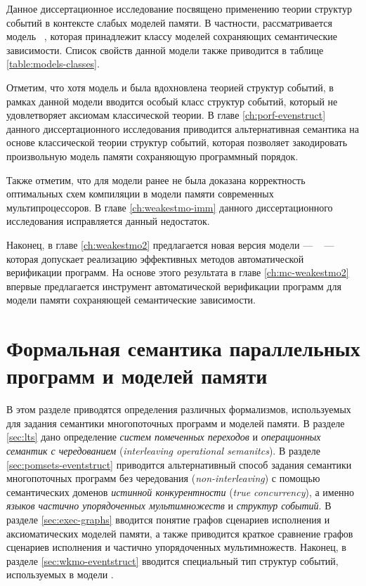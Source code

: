 Данное диссертационное исследование посвящено 
применению теории структур событий в контексте слабых моделей памяти. 
В частности, рассматривается модель \Wkm~\cite{Chakraborty-Vafeiadis:POPL19}, 
которая принадлежит классу моделей сохраняющих семантические зависимости. 
Список свойств данной модели также приводится в таблице \ref{table:models-classes}.

Отметим, что хотя модель \Wkm и была вдохновлена 
теорией структур событий, в рамках данной модели 
вводится особый класс структур событий, 
который не удовлетворяет аксиомам классической теории.
В главе \ref{ch:porf-evenstruct} данного диссертационного исследования 
приводится альтернативная семантика на основе 
классической теории структур событий,  
которая позволяет закодировать произвольную 
модель памяти сохраняющую программный порядок.

Также отметим, что для модели \Wkm ранее не была 
доказана корректность оптимальных схем компиляции 
в модели памяти современных мультипроцессоров. 
В главе \ref{ch:weakestmo-imm} данного диссертационного исследования 
исправляется данный недостаток. 

Наконец, в главе \ref{ch:weakestmo2} предлагается новая версия модели \Wkm --- 
\WkmS~ --- которая допускает реализацию эффективных методов 
автоматической верификации программ.
На основе этого результата в главе \ref{ch:mc-weakestmo2} 
впервые предлагается инструмент 
автоматической верификации программ для модели памяти 
сохраняющей семантические зависимости.  

\section{Формальная семантика параллельных программ и моделей памяти}

В этом разделе приводятся определения различных формализмов,
используемых для задания семантики многопоточных программ и моделей памяти.
В разделе \cref{sec:lts} дано определение \emph{систем помеченных переходов}
и \emph{операционных семантик с чередованием} 
(\emph{interleaving operational semanitcs}).
В разделе \cref{sec:pomsets-eventstruct} приводится альтернативный способ
задания семантики многопоточных программ без чередования 
(\emph{non-interleaving}) 
с помощью семантических доменов \emph{истинной конкурентности} 
(\emph{true concurrency}), а именно 
\emph{языков частично упорядоченных мультимножеств} и \emph{структур событий}.
В разделе \cref{sec:exec-graphs} вводится понятие графов сценариев исполнения
и аксиоматических моделей памяти, а также приводится краткое сравнение
графов сценариев исполнения и частично упорядоченных мультимножеств.
Наконец, в разделе \cref{sec:wkmo-eventstruct} вводится
специальный тип структур событий, используемых в модели \Wkm.

